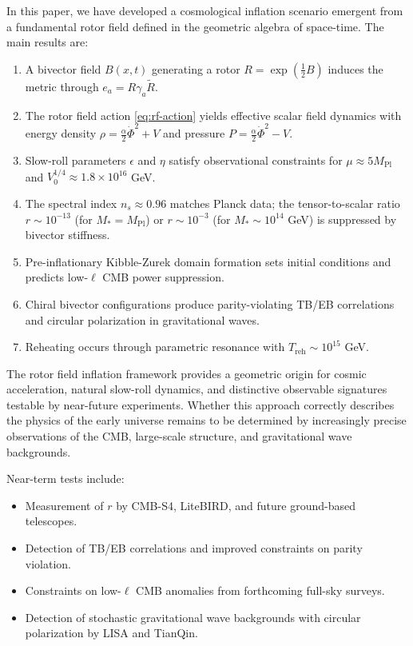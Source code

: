 \documentclass[11pt,a4paper]{article}
\numberwithin{equation}{section}
\theoremstyle{plain}
\theoremstyle{definition}
\theoremstyle{remark}
\begin{document}
In this paper, we have developed a cosmological inflation scenario emergent from a fundamental rotor field defined in the geometric algebra of space-time. The main results are:

\begin{enumerate}
  \item A bivector field $B(x,t)$ generating a rotor $R = \exp(\frac{1}{2}B)$ induces the metric through $e_a = R\gamma_a\widetilde{R}$.
  \item The rotor field action \eqref{eq:rf-action} yields effective scalar field dynamics with energy density $\rho = \frac{\alpha}{2}\dot{\Phi}^2 + V$ and pressure $P = \frac{\alpha}{2}\dot{\Phi}^2 - V$.
  \item Slow-roll parameters $\epsilon$ and $\eta$ satisfy observational constraints for $\mu \approx 5M_{\mathrm{Pl}}$ and $V_0^{1/4} \approx 1.8 \times 10^{16}$ GeV.
  \item The spectral index $n_s \approx 0.96$ matches Planck data; the tensor-to-scalar ratio $r \sim 10^{-13}$ (for $M_* = M_{\mathrm{Pl}}$) or $r \sim 10^{-3}$ (for $M_* \sim 10^{14}$ GeV) is suppressed by bivector stiffness.
  \item Pre-inflationary Kibble-Zurek domain formation sets initial conditions and predicts low-$\ell$ CMB power suppression.
  \item Chiral bivector configurations produce parity-violating TB/EB correlations and circular polarization in gravitational waves.
  \item Reheating occurs through parametric resonance with $T_{\mathrm{reh}} \sim 10^{15}$ GeV.
\end{enumerate}

The rotor field inflation framework provides a geometric origin for cosmic acceleration, natural slow-roll dynamics, and distinctive observable signatures testable by near-future experiments. Whether this approach correctly describes the physics of the early universe remains to be determined by increasingly precise observations of the CMB, large-scale structure, and gravitational wave backgrounds.

Near-term tests include:
\begin{itemize}
  \item Measurement of $r$ by CMB-S4, LiteBIRD, and future ground-based telescopes.
  \item Detection of TB/EB correlations and improved constraints on parity violation.
  \item Constraints on low-$\ell$ CMB anomalies from forthcoming full-sky surveys.
  \item Detection of stochastic gravitational wave backgrounds with circular polarization by LISA and TianQin.
\end{itemize}
\end{document}
